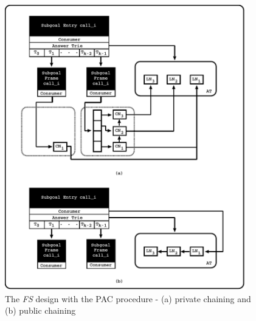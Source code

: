 \documentclass{llncs}
\begin{document}
\begin{figure}[!ht]
\vspace{-\intextsep}
\centering
\includegraphics[width=10.5cm]{figures/pcc.pdf}
\caption{The \emph{FS} design with the PAC procedure - (a) private
  chaining and (b) public chaining}
\label{fig_tabtries_pcc}
\vspace{-1.0\intextsep}
\end{figure}
\end{document}
